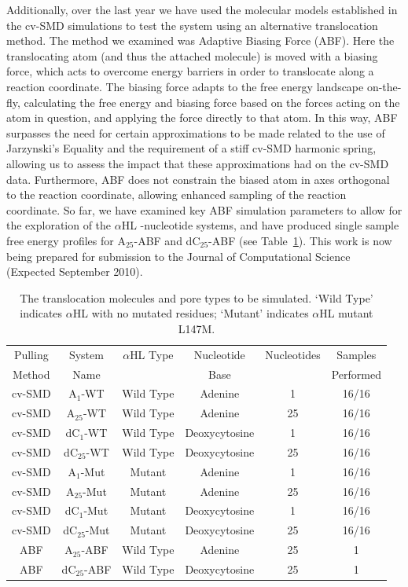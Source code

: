 \documentclass[a4paper,10pt]{article}
\newcommand{\dctfnsp}{dC$_{25}$}
\newcommand{\atfnsp}{A$_{25}$}
\newcommand{\dconsp}{dC$_{1}$}
\newcommand{\aonsp}{A$_{1}$}
\newcommand{\ahl}{$\alpha$HL }
\begin{document}
Additionally, over the last year we have used the molecular models established in the cv-SMD simulations to test the system using an alternative translocation method. The method we examined was Adaptive Biasing Force (ABF). Here the translocating atom (and thus the attached molecule) is moved with a biasing force, which acts to overcome energy barriers in order to translocate along a reaction coordinate. The biasing force adapts to the free energy landscape on-the-fly, calculating the free energy and biasing force based on the forces acting on the atom in question, and applying the force directly to that atom. In this way, ABF surpasses the need for certain approximations to be made related to the use of Jarzynski's Equality and the requirement of a stiff cv-SMD harmonic spring, allowing us to assess the impact that these approximations had on the cv-SMD data. Furthermore, ABF does not constrain the biased atom in axes orthogonal to the reaction coordinate, allowing enhanced sampling of the reaction coordinate. So far, we have examined key ABF simulation parameters to allow for the exploration of the \ahl-nucleotide systems, and have produced single sample free energy profiles for \atfnsp-ABF and \dctfnsp-ABF (see Table~\ref{table:systems1}). This work is now being prepared for submission to the Journal of Computational Science (Expected September 2010).

\begin{table}[!h]
\begin{center}
  \caption{The translocation molecules and pore types to be simulated. `Wild Type' indicates \ahl with no mutated residues; `Mutant' indicates \ahl mutant L147M.\newline }
\label{table:systems1}
\begin{tabular}{| c | c | c | c | c | c |}
\hline
Pulling & System & \ahl Type & Nucleotide & Nucleotides & Samples \\
Method & Name &  & Base &  & Performed \\
\hline
cv-SMD & \aonsp-WT & Wild Type & Adenine & 1 & 16/16  \\
cv-SMD & \atfnsp-WT & Wild Type & Adenine & 25 & 16/16  \\
cv-SMD & \dconsp-WT & Wild Type & Deoxycytosine & 1 & 16/16  \\
cv-SMD & \dctfnsp-WT & Wild Type & Deoxycytosine & 25 & 16/16 \\
cv-SMD & \aonsp-Mut & Mutant & Adenine & 1 & 16/16  \\
cv-SMD & \atfnsp-Mut & Mutant & Adenine & 25 & 16/16  \\
cv-SMD & \dconsp-Mut & Mutant & Deoxycytosine & 1 & 16/16  \\
cv-SMD & \dctfnsp-Mut & Mutant & Deoxycytosine & 25 & 16/16  \\
ABF & \atfnsp-ABF & Wild Type & Adenine & 25 & 1  \\
ABF & \dctfnsp-ABF & Wild Type & Deoxycytosine & 25 & 1  \\
\hline
\end{tabular}
\end{center}
\end{table}
\end{document}
